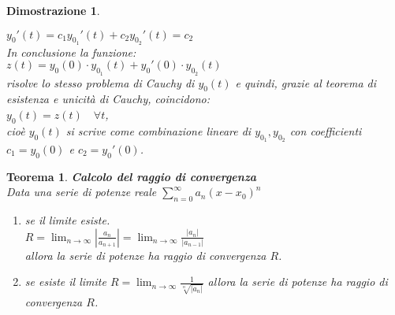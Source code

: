 \documentclass[10pt,landscape, a4paper]{article}
\newtheorem{teorema}{Teorema}
\newenvironment{thm}{\begin{mdframed}[backgroundcolor=white]\begin{teorema}}{\end{teorema}\end{mdframed}}
\newtheorem{demnstrn}{Dimostrazione}
\newenvironment{dimostrazione}{\begin{mdframed}[backgroundcolor=white]\begin{demnstrn}}{\end{demnstrn}\end{mdframed}}
\begin{document}
\begin{multicols}{3}
\begin{dimostrazione}
\begin{itemize}
\begin{enumerate}
					\medskip
					$ y_0'(t) = c_1y_{0_1}'(t) + c_2y_{0_2}'(t) = c_2$\\
					In conclusione la funzione:\\
					$z(t) = y_0(0)\cdot y_{0_1}(t) + y_0'(0)\cdot y_{0_2}(t)$\\
					risolve lo stesso problema di Cauchy di $y_0(t)$ e quindi, grazie al teorema di esistenza e unicità di Cauchy, coincidono:\\
					$y_0(t) = z(t) \quad \forall t$,\\
					cioè $y_0(t)$ si scrive come combinazione lineare di $y_{0_1}, y_{0_2}$ con coefficienti $c_1=y_0(0)$ e $c_2=y_0'(0)$.\\
\end{enumerate}
\end{itemize}
\end{dimostrazione}




\begin{thm}
\textbf{Calcolo del raggio di convergenza}\\
	Data una serie di potenze reale $\sum_{n=0}^\infty a_n \left(x-x_0\right)^n$\\
	\begin{enumerate}
		\item[$i)$] se il limite esiste.\\$R=\lim_{n\to\infty} \left\lvert \frac{a_n}{a_{n+1}}\right\rvert = \lim_{n\to\infty} \frac{|a_n|}{|a_{n-1}|}$\\allora la serie di potenze ha raggio di convergenza $R$.
		\item[$ii)$] se esiste il limite $R=\lim_{n\to\infty} \frac{1}{\sqrt[n]{\left\lvert a_n\right\rvert }}$ allora la serie di potenze ha raggio di convergenza $R$.
	\end{enumerate}
\end{thm}


\end{multicols}
\end{document}
